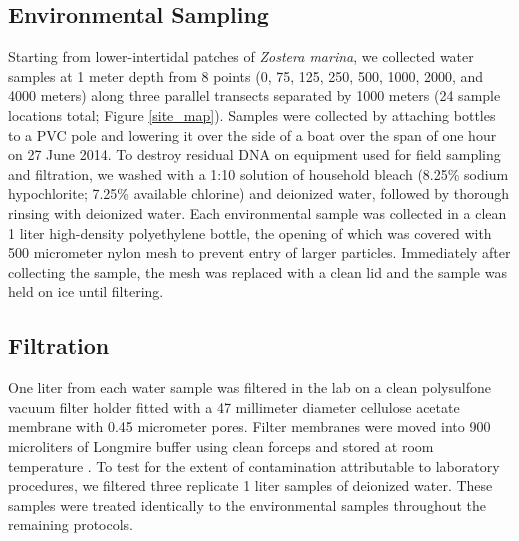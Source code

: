 \documentclass[11pt,letterpaper]{article} %
\begin{document}
\subsection*{Environmental Sampling}
Starting from lower-intertidal patches of \textit{Zostera marina}, we collected water samples at 1 meter depth from 8 points (0, 75, 125, 250, 500, 1000, 2000, and 4000 meters) along three parallel transects separated by 1000 meters (24 sample locations total; Figure \ref{site_map}). Samples were collected by attaching bottles to a PVC pole and lowering it over the side of a boat over the span of one hour on 27 June 2014. To destroy residual DNA on equipment used for field sampling and filtration, we washed with a 1:10 solution of household bleach (8.25\% sodium hypochlorite; 7.25\% available chlorine) and deionized water, followed by thorough rinsing with deionized water. Each environmental sample was collected in a clean 1 liter high-density polyethylene bottle, the opening of which was covered with 500 micrometer nylon mesh to prevent entry of larger particles. Immediately after collecting the sample, the mesh was replaced with a clean lid and the sample was held on ice until filtering.

\subsection*{Filtration}
One liter from each water sample was filtered in the lab on a clean polysulfone vacuum filter holder fitted with a 47 millimeter diameter cellulose acetate membrane with 0.45 micrometer pores. Filter membranes were moved into 900 microliters of Longmire buffer \citep{Longmire1997} using clean forceps and stored at room temperature \citep{Renshaw2014}. To test for the extent of contamination attributable to laboratory procedures, we filtered three replicate 1 liter samples of deionized water. These samples were treated identically to the environmental samples throughout the remaining protocols.
\end{document}
